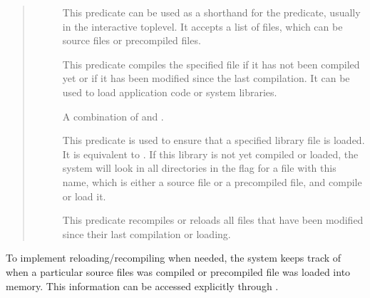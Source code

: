 \begin{quote}
\begin{description}
\item[]
This predicate can be used as a shorthand for the  predicate,
usually in the interactive toplevel.
It accepts a list of files, which can be source files or precompiled files.

\item[]
This predicate compiles the specified file if it has not been compiled
yet or if it has been modified since the last compilation.
It can be used to load application code or system libraries.

\item[]
A combination of  and .

\item[]
This predicate is used to ensure that a specified library file is loaded.
It is equivalent to .
If this library is not yet compiled or loaded, the system will look
in all directories in the  flag for a file with this
name,
which is either a source file or a precompiled file, and compile or load it.

\item[]
This predicate recompiles or reloads all files that have been modified
since their last compilation or loading.
\end{description}
\end{quote}

To implement reloading/recompiling when needed, the system keeps track of
when a particular source files was compiled or precompiled file was loaded
into memory.  This information can be accessed explicitly through
.




